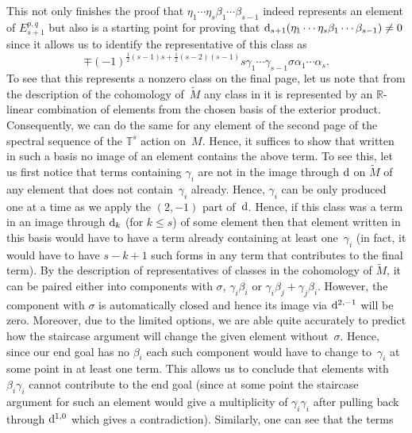 \documentclass[10pt,a4paper]{amsart}
\numberwithin{equation}{section}
\theoremstyle{definition}
\begin{document}
This not only finishes the proof that $\eta_1\cdots \eta_s\beta_1\cdots \beta_{s-1}$ indeed represents an element of $E_{s+1}^{p,q}$ but also is a starting point for proving that ${\rm d}_{s+1}(\eta_1\cdots \eta_s\beta_1\cdots \beta_{s-1})\neq 0$ since it allows us to identify the representative of this class as
\[\mp (-1)^{\frac{1}{2}(s-1)s+\frac{1}{2}(s-2)(s-1)}s\gamma_1\cdots \gamma_{s-1}\sigma\alpha_1\cdots \alpha_s.\]
To see that this represents a nonzero class on the final page, let us note that from the description of the cohomology of~$\tilde{M}$ any class in it is represented by an $\mathbb{R}$-linear combination of elements from the chosen basis of the exterior product. Consequently, we can do the same for any element of the second page of the spectral sequence of the $\mathbb{T}^s$ action on~$M$. Hence, it suffices to show that written in such a basis no image of an element contains the above term. To see this, let us first notice that terms containing $\gamma_i$ are not in the image through ${\rm d}$ on $\tilde{M}$ of any element that does not contain~$\gamma_i$ already. Hence, $\gamma_i$ can be only produced one at a time as we apply the $(2,-1)$ part of~${\rm d}$. Hence, if this class was a term in an image through ${\rm d}_k$ (for $k\leq s$) of some element then that element written in this basis would have to have a term already containing at least one~$\gamma_i$ (in fact, it would have to have $s-k+1$ such forms in any term that contributes to the final term). By the description of representatives of classes in the cohomology of $\tilde{M}$, it can be paired either into components with $\sigma$, $\gamma_i\beta_i$ or $\gamma_i\beta_j+\gamma_j\beta_i$. However, the component with $\sigma$ is automatically closed and hence its image via ${\rm d}^{2,-1}$ will be zero. Moreover, due to the limited options, we are able quite accurately to predict how the staircase argument will change the given element without~$\sigma$. Hence, since our end goal has no $\beta_i$ each such component would have to change to~$\gamma_i$ at some point in at least one term. This allows us to conclude that elements with $\beta_i\gamma_i$ cannot contribute to the end goal (since at some point the staircase argument for such an element would give a multiplicity of $\gamma_i\gamma_i$ after pulling back through ${\rm d}^{1,0}$ which gives a contradiction). Similarly, one can see that the terms
\end{document}
